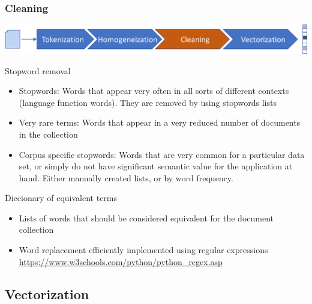 \documentclass{beamer}
\begin{document}
\begin{frame}

    \frametitle{Cleaning}

    \centerline{\includegraphics[width=\textwidth]{./figs/NLPTM_cleaning.png}}

\footnotesize

    \begin{block}{Stopword removal}
    		\begin{itemize}
    			\item Stopwords: Words that appear very often in all sorts of different contexts (language function words). They are removed by using stopwords lists
    			\item Very rare terms: Words that appear in a very reduced number of documents in the collection
    			\item Corpus specific stopwords: Words that are very common for a particular data set, or simply do not have significant semantic value for the application at hand. Either manually created lists, or by word frequency.
    		\end{itemize}
    \end{block}
    \begin{block}{Diccionary of equivalent terms}
        \begin{itemize}
        	\item Lists of words that should be considered equivalent for the document collection
        	\item Word replacement efficiently implemented using regular expressions \url{https://www.w3schools.com/python/python_regex.asp}
        \end{itemize}
    \end{block}			
    
\end{frame}


\subsection{Vectorization}
\end{document}
